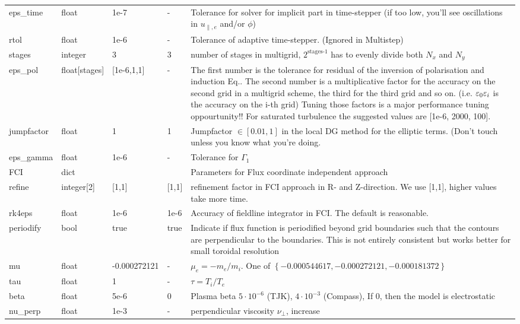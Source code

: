 \begin{longtable}{llllp{6cm}}
\\
eps\_time   & float & 1e-7  & - & Tolerance for solver for implicit part in
time-stepper (if too low, you'll see oscillations in $u_{\parallel,e}$ and/or $\phi$)
\\
rtol  & float &1e-6   & - &Tolerance of adaptive time-stepper. (Ignored in Multistep)
\\
stages      & integer & 3 & 3 & number of stages in multigrid, $2^{\text{stages-1}}$
has to evenly divide both $N_x$ and $N_y$
\\
eps\_pol    & float[stages] & [1e-6,1,1]  & - &  The first number is the tolerance for residual of the inversion of polarisation and induction Eq.. The second number is a multiplicative factor for the accuracy on the second grid in a multigrid scheme, the third for the third grid and so on.  (i.e. $\varepsilon_0\varepsilon_i$ is the accuracy on the i-th grid)
Tuning those factors is a major performance tuning oppourtunity!! For saturated turbulence the suggested values are [1e-6, 2000, 100].
\\
jumpfactor  & float & 1 & 1 & Jumpfactor $\in \left[0.01,1\right]$ in the local DG method for the elliptic terms. (Don't touch unless you know what you're doing.
\\
eps\_gamma  & float & 1e-6  & - & Tolerance for $\Gamma_1$
\\
FCI & dict & & & Parameters for Flux coordinate independent approach
\\
\qquad refine     & integer[2] & [1,1] & [1,1] & refinement factor in FCI approach in R- and Z-direction.
We use [1,1], higher values take more time.
\\
\qquad rk4eps     & float & 1e-6 & 1e-6 & Accuracy of fieldline integrator in FCI. The default is reasonable.
\\
\qquad periodify & bool & true & true & Indicate if flux function is periodified beyond grid boundaries such that the contours are perpendicular to the boundaries. This is not entirely consistent but works better for small toroidal resolution
\\
mu         & float & -0.000272121& - & $\mu_e =-m_e/m_i$.
    One of $\left\{ -0.000544617, -0.000272121, -0.000181372 \right\}$
\\
tau        & float &1      & - & $\tau = T_i/T_e$
\\
beta       & float & 5e-6  & 0 & Plasma beta $5\cdot 10^{-6}$ (TJK), $4\cdot
10^{-3}$ (Compass), If $0$, then the model is electrostatic
\\
nu\_perp   & float &1e-3   & - & perpendicular viscosity $\nu_\perp$, increase

\end{longtable}
